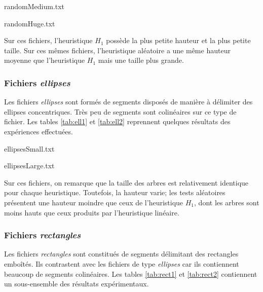\begin{table}
\caption{randomMedium.txt}\label{tab:rand1}

\end{table}

\begin{table}
\caption{randomHuge.txt}\label{tab:rand2}

\end{table}

Sur ces fichiers, l'heuristique $H_1$
possède la plus petite hauteur et la plus petite taille.
Sur ces mêmes fichiers, l'heuristique aléatoire a une même hauteur moyenne
que l'heuristique $H_1$ mais une taille plus grande.
\subsubsection*{Fichiers \og\emph{ellipses}\fg}
Les fichiers \og\emph{ellipses}\fg{} sont formés de segments disposés de manière
à délimiter des ellipses concentriques. Très peu de segments
sont colinéaires sur ce type de fichier.
Les tables \ref{tab:ell1} et \ref{tab:ell2} reprennent quelques
résultats des expériences effectuées.

\begin{table}
\caption{ellipsesSmall.txt}\label{tab:ell1}

\end{table}

\begin{table}
\caption{ellipsesLarge.txt}\label{tab:ell2}

\end{table}

Sur ces fichiers, on remarque que la taille des arbres
est relativement identique pour chaque heuristique.
Toutefois, la hauteur varie; les tests aléatoires présentent
une hauteur moindre que ceux de l'heuristique $H_1$, dont les arbres
sont moins hauts que ceux produits par l'heuristique linéaire.

\subsubsection*{Fichiers \og\emph{rectangles}\fg}
Les fichiers \og\emph{rectangles}\fg{} sont constitués de segments
délimitant des rectangles emboîtés. Ils contrastent avec les fichiers
de type \og\emph{ellipses}\fg{} car ils contiennent beaucoup de segments
colinéaires. Les tables \ref{tab:rect1} et \ref{tab:rect2} contiennent
un sous-ensemble des résultats expérimentaux.

